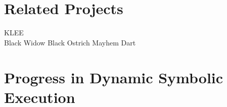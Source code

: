 \section{Related Projects}
KLEE \cite{cadar_klee_nodate}\\
Black Widow \cite{eriksson_black_2021}
Black Ostrich \cite{eriksson_black_2023}
Mayhem \cite{cha_unleashing_2012}
Dart \cite{godefroid_random_2007}
\section{Progress in Dynamic Symbolic Execution}
